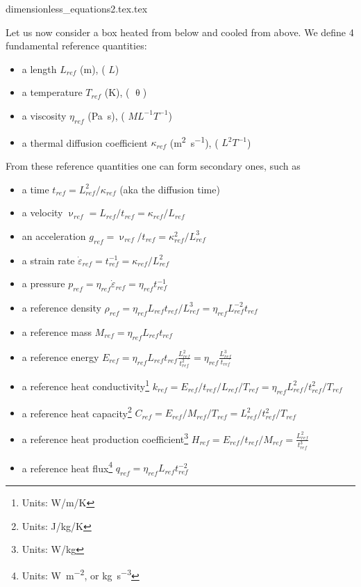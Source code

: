 \begin{flushright} {\tiny {\color{gray} dimensionless\_equations2.tex.tex}} \end{flushright}

Let us now consider a box heated from below and cooled from above. 
We define 4 fundamental reference quantities:
\begin{itemize}
\item a length $L_{ref}$ (\si{\metre}), ({\color{violet} $L$})
\item a temperature $T_{ref}$ (\si{\kelvin}), ({\color{violet} $\uptheta$})
\item a viscosity $\eta_{ref}$ (\si{\pascal\second}), ({\color{violet} $ML^{-1}T^{-1}$})
\item a thermal diffusion coefficient $\kappa_{ref}$ (\si{\square\metre\per\second}), ({\color{violet} $L^2T^{-1}$})
\end{itemize}
From these reference quantities one can form secondary ones, such as
\begin{itemize}
\item a time $t_{ref} = L_{ref}^2 / \kappa_{ref}$ (aka the diffusion time)
\item a velocity $\upnu_{ref} = L_{ref} / t_{ref} = \kappa_{ref}/L_{ref}$
\item an acceleration $g_{ref} = \upnu_{ref} / t_{ref} = \kappa_{ref}^2/L_{ref}^3$
\item a strain rate $\dot{\varepsilon}_{ref} = t_{ref}^{-1} = \kappa_{ref} / L_{ref}^2$
\item a pressure $p_{ref} = \eta_{ref} \dot{\varepsilon}_{ref} = \eta_{ref} t_{ref}^{-1}$
\item a reference density $\rho_{ref} = \eta_{ref} L_{ref} t_{ref}/L_{ref}^3 = \eta_{ref} L_{ref}^{-2} t_{ref}$
\item a reference mass $M_{ref} = \eta_{ref} L_{ref} t_{ref}$
\item a reference energy $E_{ref} = \eta_{ref} L_{ref} t_{ref} \frac{L_{ref}^2}{t_{ref}^2} 
= \eta_{ref} \frac{L_{ref}^3}{t_{ref}}$
\item a reference heat conductivity\footnote{Units: W/m/K} $k_{ref}= E_{ref}/t_{ref}/L_{ref}/T_{ref}
= \eta_{ref} L_{ref}^2/t_{ref}^2/T_{ref}$
\item a reference heat capacity\footnote{Units: J/kg/K} 
$C_{ref}=E_{ref}/M_{ref}/T_{ref} = L_{ref}^2 /t_{ref}^2/T_{ref} $
\item a reference heat production coefficient\footnote{Units: W/kg}
$H_{ref}= E_{ref}/t_{ref}/M_{ref} = \frac{L_{ref}^2}{t_{ref}^3}$
\item a reference heat flux\footnote{Units: \si{\watt\per\square\meter}, or \si{\kg\per\cubic\second}} 
$q_{ref}= \eta_{ref} L_{ref} t_{ref}^{-2}$
\end{itemize}
